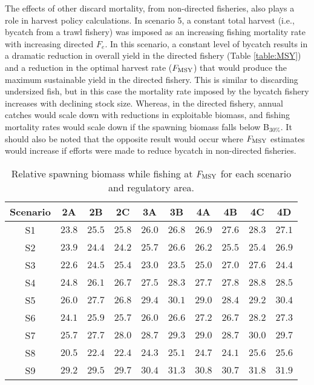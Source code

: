 The effects of other discard mortality, from non-directed fisheries, also plays a role in harvest policy calculations.  In scenario 5, a constant total harvest (i.e., bycatch from a trawl fishery) was imposed as an increasing fishing mortality rate with increasing directed $F_e$.  In this scenario, a constant level of bycatch results in a dramatic reduction in overall yield in the directed fishery (Table \ref{table:MSY}) and a reduction in the optimal harvest rate ($F_{\rm{MSY}}$) that would produce the maximum sustainable yield in the directed fishery.  This is similar to discarding undersized fish, but in this case the mortality rate imposed by the bycatch fishery increases with declining stock size.  Whereas, in the directed fishery, annual catches would scale down with reductions in exploitable biomass, and fishing mortality rates would scale down if the spawning biomass falls below B$_{30\%}$.  It should also be noted that the opposite result would occur where $F_{\rm{MSY}}$ estimates would increase if efforts were made to reduce bycatch in non-directed fisheries.  

\begin{table}
	\caption{Relative spawning biomass while fishing at $F_{\rm{MSY}}$ for each scenario and regulatory area.}
	\label{table:Bmsy}
	\begin{center}
		\begin{tabular}{c|ccccccccc}
		\hline
		Scenario & 2A & 2B & 2C & 3A & 3B & 4A & 4B & 4C & 4D\\
		\hline		%
		S1&$23.8$&$25.5$&$25.8$&$26.0$&$26.8$&$26.9$&$27.6$&$28.3$&$27.1$\tabularnewline
		S2&$23.9$&$24.4$&$24.2$&$25.7$&$26.6$&$26.2$&$25.5$&$25.4$&$26.9$\tabularnewline
		S3&$22.6$&$24.5$&$25.4$&$23.0$&$23.5$&$25.0$&$27.0$&$27.6$&$24.4$\tabularnewline
		S4&$24.8$&$26.1$&$26.7$&$27.5$&$28.3$&$27.7$&$27.8$&$28.8$&$28.5$\tabularnewline
		S5&$26.0$&$27.7$&$26.8$&$29.4$&$30.1$&$29.0$&$28.4$&$29.2$&$30.4$\tabularnewline
		S6&$24.1$&$25.9$&$25.7$&$26.0$&$26.6$&$27.2$&$26.7$&$28.2$&$27.3$\tabularnewline
		S7&$25.7$&$27.7$&$28.0$&$28.7$&$29.3$&$29.0$&$28.7$&$30.0$&$29.7$\tabularnewline
		S8&$20.5$&$22.4$&$22.4$&$24.3$&$25.1$&$24.7$&$24.1$&$25.6$&$25.6$\tabularnewline
		S9&$29.2$&$29.5$&$29.7$&$30.4$&$31.3$&$30.8$&$30.7$&$31.8$&$31.9$\tabularnewline
		\hline
		\end{tabular}
	\end{center}
\end{table}

